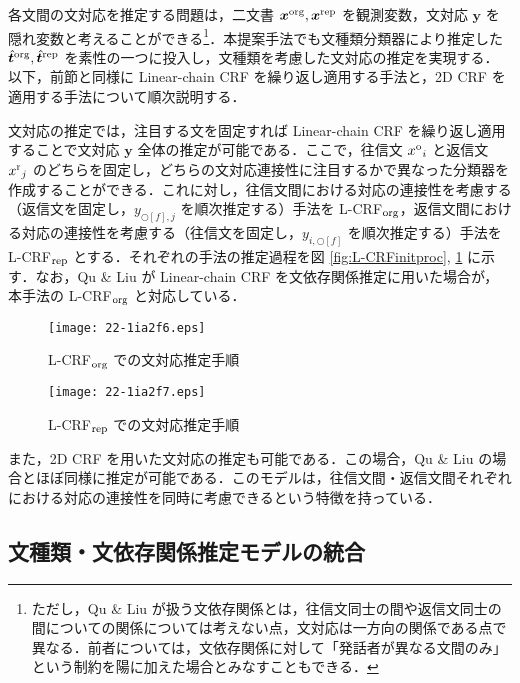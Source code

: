\documentclass[japanese]{jnlp_1.4}
\begin{document}
各文間の文対応を推定する問題は，二文書 $\bm{x}^{\rm org}, \bm{x}^{\rm rep}$ を観測変数，文対応 $\bm{y}$ を隠れ変数と考えることができる\footnote{ただし，Qu \& Liu が扱う文依存関係とは，往信文同士の間や返信文同士の間についての関係については考えない点，文対応は一方向の関係である点で異なる．前者については，文依存関係に対して「発話者が異なる文間のみ」という制約を陽に加えた場合とみなすこともできる．}．本提案手法でも文種類分類器により推定した $\hat{\bm{t}}^{\rm org}, \hat{\bm{t}}^{\rm rep}$ を素性の一つに投入し，文種類を考慮した文対応の推定を実現する．以下，前節と同様に Linear-chain CRF を繰り返し適用する手法と，2D CRF を適用する手法について順次説明する．

文対応の推定では，注目する文を固定すれば Linear-chain CRF を繰り返し適用することで文対応 $\bm{y}$ 全体の推定が可能である．ここで，往信文 ${x^{\rm o}}_i$ と返信文 ${x^{\rm r}}_j$ のどちらを固定し，どちらの文対応連接性に注目するかで異なった分類器を作成することができる．これに対し，往信文間における対応の連接性を考慮する（返信文を固定し，$y_{\Circle[f],j}$ を順次推定する）手法を L-CRF$_{\rm{org}}$，返信文間における対応の連接性を考慮する（往信文を固定し，$y_{i,\Circle[f]}$ を順次推定する）手法を L-CRF$_{\rm{rep}}$ とする．それぞれの手法の推定過程を図 \ref{fig:L-CRFinitproc}, \ref{fig:L-CRFrepproc} に示す．なお，Qu \& Liu が Linear-chain CRF を文依存関係推定に用いた場合が，本手法の L-CRF$_{\rm{org}}$ と対応している．

\begin{figure}[t]
\begin{minipage}{0.49\hsize}
\begin{center}
\texttt{[image: 22-1ia2f6.eps]}
\end{center}
\caption{L-CRF$_{\rm{org}}$ での文対応推定手順}
\label{fig:L-CRFinitproc}
\end{minipage}
\begin{minipage}{0.49\hsize}
\begin{center}
\texttt{[image: 22-1ia2f7.eps]}
\end{center}
\caption{L-CRF$_{\rm{rep}}$ での文対応推定手順}
\label{fig:L-CRFrepproc}
\end{minipage}
\end{figure}

また，2D CRF を用いた文対応の推定も可能である．この場合，Qu \& Liu の場合とほぼ同様に推定が可能である．このモデルは，往信文間・返信文間それぞれにおける対応の連接性を同時に考慮できるという特徴を持っている．


\subsection{文種類・文依存関係推定モデルの統合} \label{sec:proposal-combine}
\end{document}

